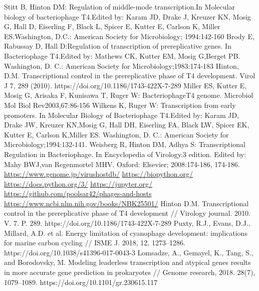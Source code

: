 \documentclass[14pt]{extarticle}
\begin{document}
\newpage
\begin{thebibliography}{9}
     {Stitt B, Hinton DM: Regulation of middle-mode transcription.In Molecular biology  of  
    bacteriophage  T4.Edited by: Karam JD, Drake J, Kreuzer KN, Mosig G, Hall D, Eiserling F, Black L, Spicer E, Kutter 
    E, Carlson K, Miller ES.Washington, D.C.: American Society for Microbiology; 1994:142-160}
     {Brody E, Rabussay D, Hall D:Regulation of transcription of prereplicative genes. In Bacteriophage
    T4.Edited by: Mathews CK, Kutter EM, Mosig G,Berget PB. Washington, D. C.: American Society for 
    Microbiology;1983:174-183}
     Hinton, D.M. Transcriptional control in the prereplicative phase of T4 development. Virol J 7, 289 (2010). https://doi.org/10.1186/1743-422X-7-289
     Miller ES, Kutter E, Mosig G, Arisaka F, Kunisawa T, Ruger W: BacteriophageT4 genome. Microbiol  
    Mol  Biol  Rev2003,67:86-156
     Wilkens K, Ruger W: Transcription from early promoters. In Molecular Biology  of  Bacteriophage  
    T4.Edited by: Karam JD, Drake JW, Kreuzer KN,Mosig G, Hall DH, Eiserling FA, Black LW, Spicer EK, Kutter E, Carlson 
    K,Miller ES. Washington, D. C.: American Society for Microbiology;1994:132-141.
     Weisberg R, Hinton DM, Adhya S: Transcriptional Regulation in Bacteriophage. In Encyclopedia  of  
    Virology.3 edition. Edited by: Mahy BWJ,van Regenmortel MHV. Oxford: Elsevier; 2008:174-186, 174-186.
     \url{https://www.genome.jp/virushostdb/}
     \url{https://biopython.org/}
     \url{https://docs.python.org/3/}
     \url{https://jupyter.org/}
     \url{https://github.com/poolsar42/phages-and-hosts}
     \url{https://www.ncbi.nlm.nih.gov/books/NBK25501/}
     Hinton D.M. Transcriptional control in the prereplicative phase of T4 development // Virology
    journal. 2010. V. 7. P. 289. https://doi.org/10.1186/1743-422X-7-289
     Puxty, R.J., Evans, D.J., Millard, A.D. et al. Energy limitation of cyanophage development:
    implications for marine carbon cycling // ISME J. 2018, 12, 1273–1286. https://doi.org/10.1038/s41396-017-0043-3
     Lomsadze, A., Gemayel, K., Tang, S., and Borodovsky, M. Modeling leaderless transcription and
    atypical genes results in more accurate gene prediction in prokaryotes // Genome research,  2018. 28(7), 1079–1089.
    https://doi.org/10.1101/gr.230615.117

\end{thebibliography}
\end{document}
